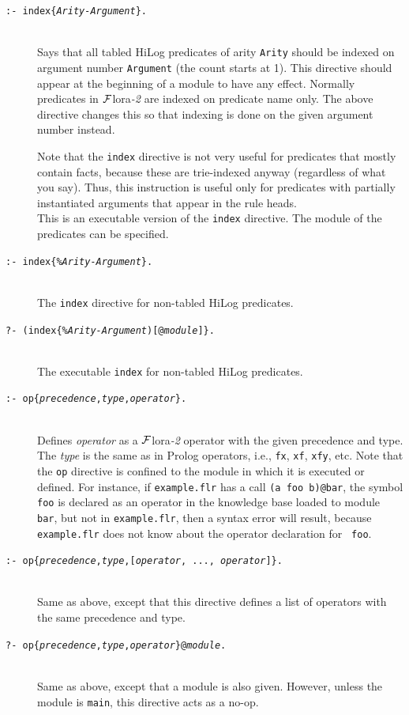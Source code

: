 \documentclass[11pt]{article}
\newcommand{\FLORA}{{\mbox{\sc ${\cal F}${lora}\rm\emph{-2}}}\xspace}
\newcommand{\FLSYSTEM}{\FLORA}
\newcommand{\flrext}{flr\xspace}
\begin{document}
\begin{description}
\item[\texttt{:- index\{\emph{Arity-Argument}\}.}]
  ~~~\\
  Says that all tabled HiLog predicates of arity {\tt Arity} should be indexed on
  argument number {\tt Argument} (the count starts at 1). This directive
  should appear at the beginning of a module to have any effect.
  Normally predicates in \FLSYSTEM are indexed on predicate name only.
  The  above directive changes this so that indexing is done on the given
  argument number instead.

  Note that the {\tt index} directive is not very useful for predicates
  that mostly contain facts, because these are trie-indexed anyway
  (regardless of what you say). Thus, this instruction is useful only for
  predicates with partially instantiated arguments that appear in the rule
  heads.
~~~  \\
  This is an executable version of the {\tt index} directive.  The
  module of the predicates can be specified.
\item[\texttt{:- index\{\emph{\%Arity-Argument}\}.}]
~~~  \\
  The {\tt index} directive for non-tabled HiLog predicates.
\item[\texttt{?- (index\{\emph{\%Arity-Argument})[@\emph{module}]\}.}]
~~~  \\
  The executable {\tt index} for non-tabled HiLog predicates.

\item[\texttt{:- op\{{\it precedence},{\it type},{\it operator}\}.}]
 ~~~ \\
  Defines \emph{operator} as a \FLSYSTEM operator with the given precedence
  and type. The \emph{type} is the same as in Prolog operators, i.e.,
  {\tt fx}, {\tt xf}, {\tt xfy}, etc.
  Note that the {\tt op} directive is confined to
  the module in which it is executed or defined. For instance, if
  {\tt example.\flrext} has a call {\tt (a foo b)@bar}, the symbol {\tt foo} is
  declared as an operator in the knowledge base loaded to module {\tt bar}, but not in
  {\tt example.\flrext}, then a syntax error will result, because 
   {\tt example.\flrext} does not know about the operator declaration for {\tt
  foo}.
\item[\texttt{:- op\{{\it precedence},{\it type},[{\it operator}, ..., {\it operator}]\}.}]
~~~  \\
  Same as above, except that this directive defines a list of operators
  with the same precedence and type.
\item[\texttt{?- op\{{\it precedence},{\it type},{\it operator}\}@\emph{module}.}]
 ~~~ \\
  Same as above, except that a module is also given. However, unless the
  module is {\tt main}, this directive acts as a no-op.
\end{description}
\end{document}

